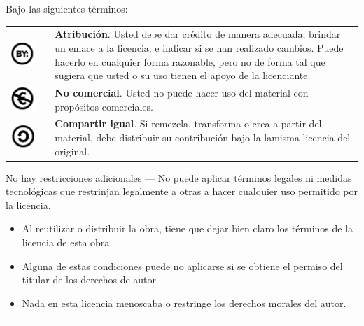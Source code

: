 Bajo las siguientes términos:
\begin{center}
\begin{tabular}{ccp{10cm}}
\includegraphics[scale=0.2]{img/cc-by} & \qquad & \textbf{Atribución}. Usted debe dar crédito de manera adecuada, brindar un enlace a la licencia, e indicar si se han realizado cambios. Puede hacerlo en cualquier forma razonable, pero no de forma tal que sugiera que usted o su uso tienen el apoyo de la licenciante.\\
\includegraphics[scale=0.2]{img/cc-e} & \qquad & \textbf{No comercial}. Usted no puede hacer uso del material con propósitos comerciales.\\
\includegraphics[scale=0.2]{img/cc-c} & \qquad & \textbf{Compartir igual}. Si remezcla, transforma o crea a partir del material, debe distribuir su contribución bajo la lamisma licencia del original.
\end{tabular}
\end{center}

No hay restricciones adicionales — No puede aplicar términos legales ni medidas tecnológicas que restrinjan legalmente a otras a hacer cualquier uso permitido por la licencia. 

\begin{itemize}
\item Al reutilizar o distribuir la obra, tiene que dejar bien claro los términos de la licencia de esta obra.
\item Alguna de estas condiciones puede no aplicarse si se obtiene el permiso del titular de los derechos de autor
\item Nada en esta licencia menoscaba o restringe los derechos morales del autor.
\end{itemize}

\hrule depth 3pt

\normalfont
\newpage